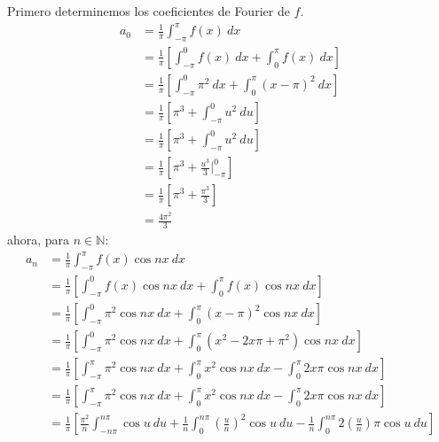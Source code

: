 \documentclass[12pt]{report}
\newcounter{it}
\theoremstyle{largebreak}
\begin{document}
    \begin{sol}
        Primero determinemos los coeficientes de Fourier de $f$.
        \begin{equation*}
            \begin{split}
                a_0&=\frac{1}{\pi}\int_{ -\pi}^\pi f(x)\:dx\\
                &=\frac{1}{\pi}\left[\int_{ -\pi}^0 f(x)\:dx+\int_{0}^\pi f(x)\:dx\right] \\
                &=\frac{1}{\pi}\left[\int_{ -\pi}^0 \pi^2\:dx+\int_{0}^\pi (x-\pi)^2\:dx\right] \\
                &=\frac{1}{\pi}\left[\pi^3+\int_{-\pi}^0 u^2\:du\right] \\
                &=\frac{1}{\pi}\left[\pi^3+\int_{-\pi}^0 u^2\:du\right] \\
                &=\frac{1}{\pi}\left[\pi^3+ \frac{u^3}{3}\Big|_{-\pi}^0 \right] \\
                &=\frac{1}{\pi}\left[\pi^3+\frac{\pi^3}{3}\right] \\
                &=\frac{4\pi^2}{3}
            \end{split}
        \end{equation*}
        ahora, para $n\in\mathbb{N}$:
        \begin{equation*}
            \begin{split}
                a_n&=\frac{1}{\pi}\int_{ -\pi}^{\pi}f(x)\cos nx\:dx\\
                &=\frac{1}{\pi}\left[\int_{ -\pi}^{0}f(x)\cos nx\:dx+\int_{0}^{\pi}f(x)\cos nx\:dx\right] \\
                &=\frac{1}{\pi}\left[\int_{ -\pi}^{0}\pi^2\cos nx\:dx+\int_{0}^{\pi}(x-\pi)^2\cos nx\:dx\right]\\
                &=\frac{1}{\pi}\left[\int_{ -\pi}^{0}\pi^2\cos nx\:dx+\int_{0}^{\pi}(x^2-2x\pi+\pi^2)\cos nx\:dx\right]\\
                &=\frac{1}{\pi}\left[\int_{ -\pi}^{\pi}\pi^2\cos nx\:dx+\int_{0}^{\pi}x^2\cos nx\:dx-\int_{0}^{\pi}2x\pi\cos nx\:dx\right]\\
                &=\frac{1}{\pi}\left[\int_{ -\pi}^{\pi}\pi^2\cos nx\:dx+\int_{0}^{\pi}x^2\cos nx\:dx-\int_{0}^{\pi}2x\pi\cos nx\:dx\right]\\
                &=\frac{1}{\pi}\left[\frac{\pi^2}{n}\int_{ -n\pi}^{n\pi}\cos u\:du+\frac{1}{n}\int_{0}^{n\pi}\left(\frac{u}{n}\right)^2 \cos u\:du-\frac{1}{n}\int_{0}^{n\pi}2\left(\frac{u}{n}\right)\pi\cos u\:du\right]\\

\end{split}
\end{equation*}
\end{sol}
\end{document}
